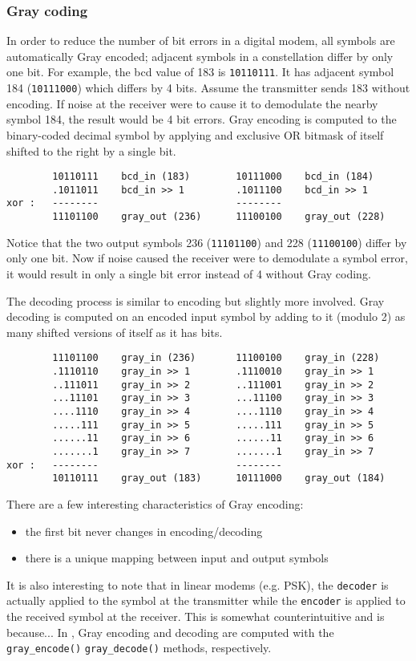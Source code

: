 \subsubsection{Gray coding}
In order to reduce the number of bit errors in a digital modem,
all symbols are automatically Gray encoded;
adjacent symbols in a constellation differ by only one bit.
%
For example, the bcd value of 183 is {\tt 10110111}.
It has adjacent symbol 184 ({\tt 10111000}) which differs by 4 bits.
Assume the transmitter sends 183 without encoding.
If noise at the receiver were to cause it to demodulate the nearby symbol 184,
the result would be 4 bit errors.
%
Gray encoding is computed to the binary-coded decimal symbol
by applying and exclusive OR bitmask of itself shifted to the right by a
single bit.
\begin{verbatim}
        10110111    bcd_in (183)        10111000    bcd_in (184)
        .1011011    bcd_in >> 1         .1011100    bcd_in >> 1
xor :   --------                        --------
        11101100    gray_out (236)      11100100    gray_out (228)
\end{verbatim}
Notice that the two output symbols
236 ({\tt 11101100}) and
228 ({\tt 11100100}) differ by only one bit.
Now if noise caused the receiver were to demodulate a symbol error, it would
result in only a single bit error instead of 4 without Gray coding.

The decoding process is similar to encoding but slightly more involved.
Gray decoding is computed on an encoded input symbol
by adding to it (modulo 2) as many shifted versions of itself as it has bits.
\begin{verbatim}
        11101100    gray_in (236)       11100100    gray_in (228)
        .1110110    gray_in >> 1        .1110010    gray_in >> 1
        ..111011    gray_in >> 2        ..111001    gray_in >> 2
        ...11101    gray_in >> 3        ...11100    gray_in >> 3
        ....1110    gray_in >> 4        ....1110    gray_in >> 4
        .....111    gray_in >> 5        .....111    gray_in >> 5
        ......11    gray_in >> 6        ......11    gray_in >> 6
        .......1    gray_in >> 7        .......1    gray_in >> 7
xor :   --------                        --------
        10110111    gray_out (183)      10111000    gray_out (184)
\end{verbatim}
There are a few interesting characteristics of Gray encoding:
\begin{itemize}
\item the first bit never changes in encoding/decoding
\item there is a unique mapping between input and output symbols
\end{itemize}
It is also interesting to note that in linear modems (e.g. PSK), the
{\tt decoder} is actually applied to the symbol at the transmitter while the
{\tt encoder} is applied to the received symbol at the receiver.
This is somewhat counterintuitive and is because...
In \liquid, Gray encoding and decoding are computed with the
{\tt gray\_encode()} {\tt gray\_decode()} methods, respectively.

